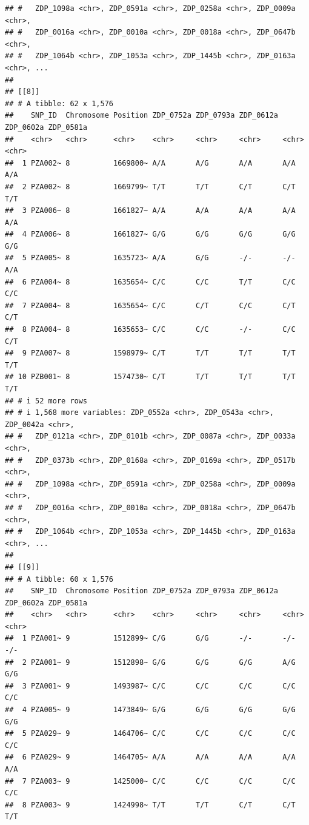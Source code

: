\documentclass[
]{article}
\begin{document}
\begin{verbatim}
## #   ZDP_1098a <chr>, ZDP_0591a <chr>, ZDP_0258a <chr>, ZDP_0009a <chr>,
## #   ZDP_0016a <chr>, ZDP_0010a <chr>, ZDP_0018a <chr>, ZDP_0647b <chr>,
## #   ZDP_1064b <chr>, ZDP_1053a <chr>, ZDP_1445b <chr>, ZDP_0163a <chr>, ...
## 
## [[8]]
## # A tibble: 62 x 1,576
##    SNP_ID  Chromosome Position ZDP_0752a ZDP_0793a ZDP_0612a ZDP_0602a ZDP_0581a
##    <chr>   <chr>      <chr>    <chr>     <chr>     <chr>     <chr>     <chr>    
##  1 PZA002~ 8          1669800~ A/A       A/G       A/A       A/A       A/A      
##  2 PZA002~ 8          1669799~ T/T       T/T       C/T       C/T       T/T      
##  3 PZA006~ 8          1661827~ A/A       A/A       A/A       A/A       A/A      
##  4 PZA006~ 8          1661827~ G/G       G/G       G/G       G/G       G/G      
##  5 PZA005~ 8          1635723~ A/A       G/G       -/-       -/-       A/A      
##  6 PZA004~ 8          1635654~ C/C       C/C       T/T       C/C       C/C      
##  7 PZA004~ 8          1635654~ C/C       C/T       C/C       C/T       C/T      
##  8 PZA004~ 8          1635653~ C/C       C/C       -/-       C/C       C/T      
##  9 PZA007~ 8          1598979~ C/T       T/T       T/T       T/T       T/T      
## 10 PZB001~ 8          1574730~ C/T       T/T       T/T       T/T       T/T      
## # i 52 more rows
## # i 1,568 more variables: ZDP_0552a <chr>, ZDP_0543a <chr>, ZDP_0042a <chr>,
## #   ZDP_0121a <chr>, ZDP_0101b <chr>, ZDP_0087a <chr>, ZDP_0033a <chr>,
## #   ZDP_0373b <chr>, ZDP_0168a <chr>, ZDP_0169a <chr>, ZDP_0517b <chr>,
## #   ZDP_1098a <chr>, ZDP_0591a <chr>, ZDP_0258a <chr>, ZDP_0009a <chr>,
## #   ZDP_0016a <chr>, ZDP_0010a <chr>, ZDP_0018a <chr>, ZDP_0647b <chr>,
## #   ZDP_1064b <chr>, ZDP_1053a <chr>, ZDP_1445b <chr>, ZDP_0163a <chr>, ...
## 
## [[9]]
## # A tibble: 60 x 1,576
##    SNP_ID  Chromosome Position ZDP_0752a ZDP_0793a ZDP_0612a ZDP_0602a ZDP_0581a
##    <chr>   <chr>      <chr>    <chr>     <chr>     <chr>     <chr>     <chr>    
##  1 PZA001~ 9          1512899~ C/G       G/G       -/-       -/-       -/-      
##  2 PZA001~ 9          1512898~ G/G       G/G       G/G       A/G       G/G      
##  3 PZA001~ 9          1493987~ C/C       C/C       C/C       C/C       C/C      
##  4 PZA005~ 9          1473849~ G/G       G/G       G/G       G/G       G/G      
##  5 PZA029~ 9          1464706~ C/C       C/C       C/C       C/C       C/C      
##  6 PZA029~ 9          1464705~ A/A       A/A       A/A       A/A       A/A      
##  7 PZA003~ 9          1425000~ C/C       C/C       C/C       C/C       C/C      
##  8 PZA003~ 9          1424998~ T/T       T/T       C/T       C/T       T/T      

\end{verbatim}
\end{document}

